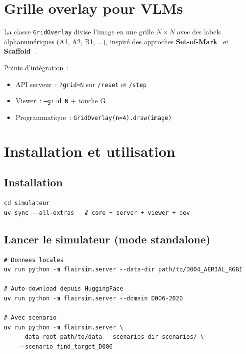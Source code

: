 \documentclass[a4paper, 11pt, french]{article}
\newcommand{\code}[1]{\texttt{#1}}
\begin{document}
\section{Grille overlay pour VLMs}
\label{sec:grid}

La classe \code{GridOverlay} divise l'image en une grille $N \times N$
avec des labels alphanumériques (A1, A2, B1, ...), inspiré des
approches \textbf{Set-of-Mark}~\cite{som} et \textbf{Scaffold}~\cite{scaffold}.

Points d'intégration~:
\begin{itemize}
  \item API serveur~: \code{?grid=N} sur \code{/reset} et \code{/step}
  \item Viewer~: \code{--grid N} + touche G
  \item Programmatique~: \code{GridOverlay(n=4).draw(image)}
\end{itemize}

\section{Installation et utilisation}
\label{sec:usage}

\subsection{Installation}

\begin{lstlisting}[style=bash]
cd simulateur
uv sync --all-extras   # core + server + viewer + dev
\end{lstlisting}

\subsection{Lancer le simulateur (mode standalone)}

\begin{lstlisting}[style=bash]
# Donnees locales
uv run python -m flairsim.server --data-dir path/to/D004_AERIAL_RGBI

# Auto-download depuis HuggingFace
uv run python -m flairsim.server --domain D006-2020

# Avec scenario
uv run python -m flairsim.server \
    --data-root path/to/data --scenarios-dir scenarios/ \
    --scenario find_target_D006
\end{lstlisting}
\end{document}

